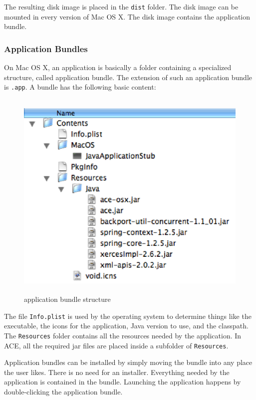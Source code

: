 \documentclass[11pt,a4paper]{article}
\begin{document}
The resulting disk image is placed in the \texttt{dist} folder. The disk
image can be mounted in every version of Mac OS X. The disk image contains
the application bundle.

\subsubsection{Application Bundles}
On Mac OS X, an application is basically a folder containing a specialized
structure, called application bundle. The extension of such an application
bundle is \texttt{.app}. A bundle has the following basic content:

\begin{figure}[H]
 \centering
 \includegraphics[width=12.3cm,height=10.2cm]{../images/developersguide/app-bundle.eps}
 \caption{application bundle structure}
\end{figure}

The file \texttt{Info.plist} is used by the operating system to determine
things like the executable, the icons for the application, Java version to
use, and the classpath. The \texttt{Resources} folder contains all the
resources needed by the application. In ACE, all the required jar files
are placed inside a subfolder of \texttt{Resources}.

Application bundles can be installed by simply moving the bundle into any
place the user likes. There is no need for an installer. Everything needed
by the application is contained in the bundle. Launching the application
happens by double-clicking the application bundle.
\end{document}
